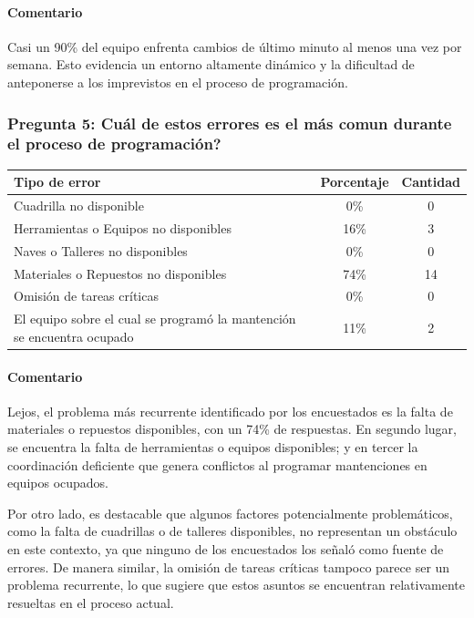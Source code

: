 \documentclass{article}
\begin{document}
\begin{appendix}
    \paragraph{Comentario} Casi un 90\% del equipo enfrenta cambios de último minuto al menos una vez por semana. Esto evidencia un entorno altamente dinámico y la dificultad de anteponerse a los imprevistos en el proceso de programación.
    
    
    \vspace{1.5em}
    \subsubsection*{Pregunta 5: Cuál de estos errores es el más comun durante el proceso de programación?}
    
    \begin{table}[H]
        \centering
        \begin{tabular}{p{7cm}cc}
            \toprule
            \textbf{Tipo de error} & \textbf{Porcentaje} & \textbf{Cantidad} \\
            \midrule
            Cuadrilla no disponible & 0\% & 0 \\
            Herramientas o Equipos no disponibles & 16\% & 3 \\
            Naves o Talleres no disponibles & 0\% & 0 \\
            Materiales o Repuestos no disponibles & 74\% & 14 \\
            Omisión de tareas críticas & 0\% & 0 \\
            El equipo sobre el cual se programó la mantención se encuentra ocupado & 11\% & 2 \\
            \bottomrule
        \end{tabular}
        \label{tab:errores_comunes}
    \end{table}
    
    \paragraph{Comentario} Lejos, el problema más recurrente identificado por los encuestados es la falta de materiales o repuestos disponibles, con un 74\% de respuestas. En segundo lugar, se encuentra la falta de herramientas o equipos disponibles; y en tercer la coordinación deficiente que genera conflictos al programar mantenciones en equipos ocupados.
    
    Por otro lado, es destacable que algunos factores potencialmente problemáticos, como la falta de cuadrillas o de talleres disponibles, no representan un obstáculo en este contexto, ya que ninguno de los encuestados los señaló como fuente de errores. De manera similar, la omisión de tareas críticas tampoco parece ser un problema recurrente, lo que sugiere que estos asuntos se encuentran relativamente resueltas en el proceso actual.
    

\end{appendix}
\end{document}
